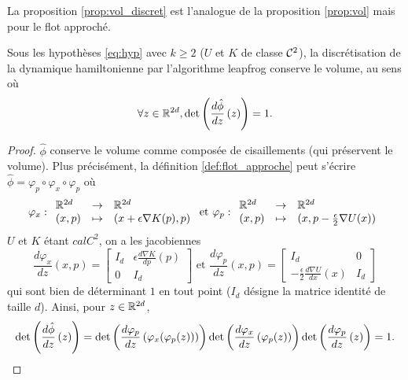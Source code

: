 \documentclass[10pt,a4paper]{article}
\begin{document}
La proposition \ref{prop:vol_discret} est l'analogue de la proposition \ref{prop:vol} mais pour le flot approché.

\begin{Prop}\label{prop:vol_discret}	
	Sous les hypothèses \eqref{eq:hyp} avec $k \geq 2$ ($U$ et $K$ de classe $\mathcal{C}^2$), la discrétisation de la dynamique hamiltonienne par l'algorithme leapfrog conserve le volume, au sens où
	$$
	\forall z \in \mathbb{R}^{2d}, \det \left( \frac{d \hat \phi}{d z} \left( z \right) \right) = 1.
	$$
\end{Prop}
\begin{proof}
	$\hat \phi$ conserve le volume comme composée de cisaillements (qui préservent le volume). Plus précisément, la définition \ref{def:flot_approche} peut s'écrire $\hat \phi= \varphi_p \circ \varphi_x \circ \varphi_p$ où
	$$
	\varphi_x : { \begin{array}{lcl} 
		\mathbb{R}^{2d} & \to & \mathbb{R}^{2d} \\
		(x,p) & \mapsto & (x + \epsilon \nabla K(p),p)
	 \end{array} }
	\text{ et }
	\varphi_p : { \begin{array}{lcl} 
		\mathbb{R}^{2d} & \to & \mathbb{R}^{2d} \\
		(x,p) & \mapsto & (x,p - \frac \epsilon 2 \nabla U(x))
	 \end{array} }
	$$
	$U$ et $K$ étant $calC^2$, on a les jacobiennes
	$$
	\frac{d\varphi_x}{dz}(x,p) =
	\begin{bmatrix}
	I_d & \epsilon \frac{d\nabla K}{dp}(p) \\
	0 & I_d
	\end{bmatrix}
	\text{ et }
	\frac{d\varphi_p}{dz}(x,p) =
	\begin{bmatrix}
	I_d & 0 \\
	- \frac \epsilon 2 \frac{d\nabla U}{dx}(x) & I_d
	\end{bmatrix}
	$$
	qui sont bien de déterminant $1$ en tout point ($I_d$ désigne la matrice identité de taille $d$). Ainsi, pour $z \in \mathbb{R}^{2d}$,
	$$
	\det \left( \frac{d \hat \phi}{d z} \left( z \right) \right) = \det \left( \frac{d \varphi_p}{d z} \left( \varphi_x(\varphi_p(z)) \right) \right) \det \left( \frac{d \varphi_x}{d z} \left( \varphi_p(z) \right) \right) \det \left( \frac{d \varphi_p}{d z} \left( z \right) \right) = 1.
	$$
\end{proof}
\end{document}
